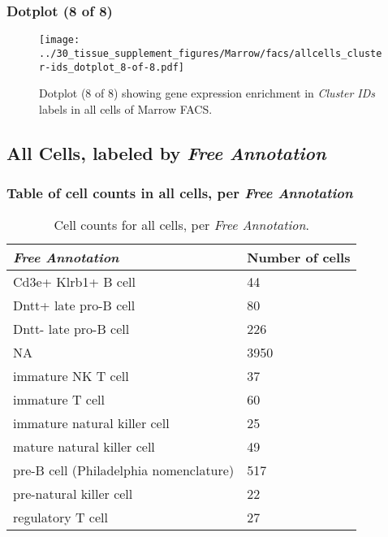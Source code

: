 \clearpage

\subsubsection{Dotplot (8 of 8)}
\begin{figure}[h]
\centering
\texttt{[image: ../30\_tissue\_supplement\_figures/Marrow/facs/allcells\_cluster-ids\_dotplot\_8-of-8.pdf]}

\caption{ Dotplot (8 of 8)  showing gene expression enrichment in \emph{Cluster IDs} labels in all cells of Marrow FACS. }
\end{figure}


\clearpage

\subsection{All Cells, labeled by \emph{Free Annotation}}
\subsubsection{Table of cell counts in all cells, per \emph{Free Annotation}}\begin{table}[h]
\centering
\label{my-label}
\begin{tabular}{@{}ll@{}}
\toprule

\emph{Free Annotation}& Number of cells \\ \midrule
Cd3e+ Klrb1+ B cell & 44 \\

Dntt+ late pro-B cell & 80 \\

Dntt- late pro-B cell & 226 \\

NA & 3950 \\

immature NK T cell & 37 \\

immature T cell & 60 \\

immature natural killer cell & 25 \\

mature natural killer cell & 49 \\

pre-B cell (Philadelphia nomenclature) & 517 \\

pre-natural killer cell & 22 \\

regulatory T cell & 27 \\
\bottomrule
\end{tabular}
\caption{Cell counts for all cells, per \emph{Free Annotation}.}
\end{table}

